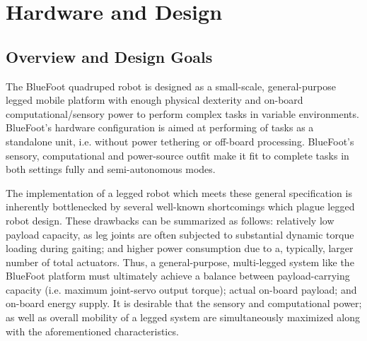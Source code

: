 
\chapter{Hardware and Design}
\label{ch::hardware_and_design}

	\section{Overview and Design Goals}
	
	The BlueFoot quadruped robot is designed as a small-scale, general-purpose legged mobile platform with enough physical dexterity and on-board computational/sensory power to perform complex tasks in variable environments. BlueFoot's hardware configuration is aimed at performing of tasks as a standalone unit, i.e. without power tethering or off-board processing. BlueFoot's sensory, computational and power-source outfit make it fit to complete tasks in both settings fully and semi-autonomous modes.

	The implementation of a legged robot which meets these general specification is inherently bottlenecked by several well-known shortcomings which plague legged robot design. These drawbacks can be summarized as follows: relatively low payload capacity, as leg joints are often subjected to substantial dynamic torque loading during gaiting; and higher power consumption due to a, typically, larger number of total actuators. Thus, a general-purpose, multi-legged system like the BlueFoot platform must ultimately achieve a balance between payload-carrying capacity (i.e. maximum joint-servo output torque); actual on-board payload; and on-board energy supply. It is desirable that the sensory and computational power; as well as overall mobility of a legged system are simultaneously maximized along with the aforementioned characteristics. 
	
